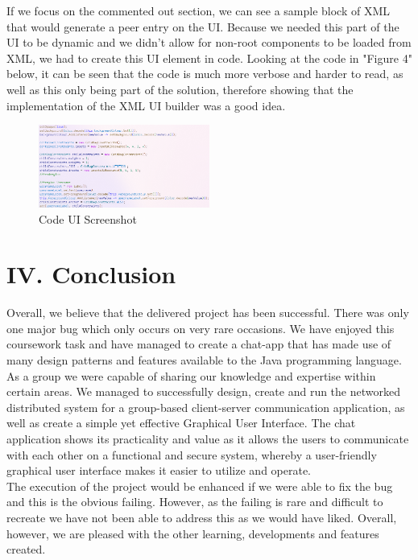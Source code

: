 \documentclass{COMPXXXX}
\begin{document}
\normalsize \textrm {If we focus on the commented out section, we can see a sample block of XML that would generate a peer entry on the UI. Because we needed this part of the UI to be dynamic and we didn't allow for non-root components to be loaded from XML, we had to create this UI element in code. Looking at the code in "Figure 4" below, it can be seen that the code is much more verbose and harder to read, as well as this only being part of the solution, therefore showing that the implementation of the XML UI builder was a good idea.}
\begin{figure}[h]
\centering
\includegraphics[width=0.5\textwidth]{code_ui.png}
\caption{Code UI Screenshot}
\label{fig:figure4}
\end{figure}

\section{IV. Conclusion}
\normalsize \textrm {Overall, we believe that the delivered project has been successful. There was only one major bug which only occurs on very rare occasions. We have enjoyed this coursework task and have managed to create a chat-app that has made use of many design patterns and features available to the Java programming language. As a group we were capable of sharing our knowledge and expertise within certain areas. We managed to successfully design, create and run the networked distributed system for a group-based client-server communication application, as well as create a simple yet effective Graphical User Interface. The chat application shows its practicality and value as it allows the users to communicate with each other on a functional and secure system, whereby a user-friendly graphical user interface makes it easier to utilize and operate.\\
The execution of the project would be enhanced if we were able to fix the bug and this is the obvious failing. However, as the failing is rare and difficult to recreate we have not been able to address this as we would have liked. Overall, however, we are pleased with the other learning, developments and features created. }
\end{document}
